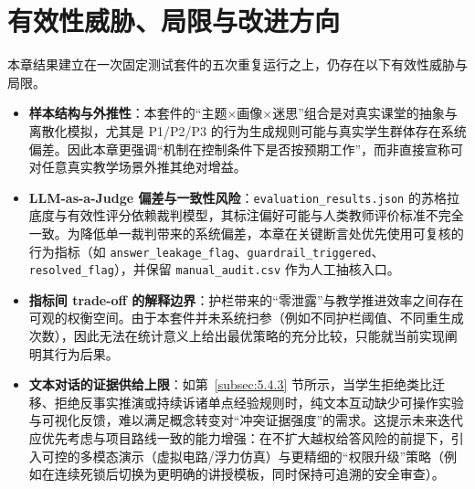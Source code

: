 \section{有效性威胁、局限与改进方向}
\label{sec:5.5}

本章结果建立在一次固定测试套件的五次重复运行之上，仍存在以下有效性威胁与局限。
\begin{itemize}
    \item \textbf{样本结构与外推性}：本套件的“主题$\times$画像$\times$迷思”组合是对真实课堂的抽象与离散化模拟，尤其是 P1/P2/P3 的行为生成规则可能与真实学生群体存在系统偏差。因此本章更强调“机制在控制条件下是否按预期工作”，而非直接宣称可对任意真实教学场景外推其绝对增益。
    \item \textbf{LLM-as-a-Judge 偏差与一致性风险}：\texttt{evaluation\_results.json} 的苏格拉底度与有效性评分依赖裁判模型，其标注偏好可能与人类教师评价标准不完全一致。为降低单一裁判带来的系统偏差，本章在关键断言处优先使用可复核的行为指标（如 \texttt{answer\_leakage\_flag}、\texttt{guardrail\_triggered}、\texttt{resolved\_flag}），并保留 \texttt{manual\_audit.csv} 作为人工抽核入口。
    \item \textbf{指标间 trade-off 的解释边界}：护栏带来的“零泄露”与教学推进效率之间存在可观的权衡空间。由于本套件并未系统扫参（例如不同护栏阈值、不同重生成次数），因此无法在统计意义上给出最优策略的充分比较，只能就当前实现阐明其行为后果。
    \item \textbf{文本对话的证据供给上限}：如第~\ref{subsec:5.4.3} 节所示，当学生拒绝类比迁移、拒绝反事实推演或持续诉诸单点经验规则时，纯文本互动缺少可操作实验与可视化反馈，难以满足概念转变对“冲突证据强度”的需求。这提示未来迭代应优先考虑与项目路线一致的能力增强：在不扩大越权给答风险的前提下，引入可控的多模态演示（虚拟电路/浮力仿真）与更精细的“权限升级”策略（例如在连续死锁后切换为更明确的讲授模板，同时保持可追溯的安全审查）。 
\end{itemize}
